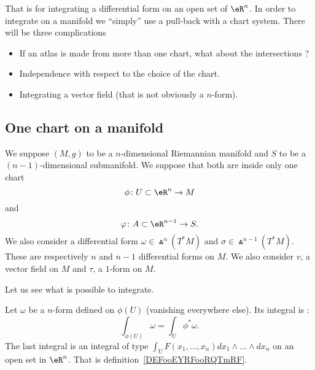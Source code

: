 That is for integrating a differential form on an open set of \( \eR^n\). In order to integrate on a manifold we ``simply'' use a pull-back with a chart system. There will be three complications
\begin{itemize}
	\item If an atlas is made from more than one chart, what about the intersections ?
	\item Independence with respect to the choice of the chart.
	\item Integrating a vector field (that is not obviously a \( n\)-form).
\end{itemize}

\subsection{One chart on a manifold}

We suppose \( (M,g)\) to be a \( n\)-dimensional Riemannian manifold and \( S\) to be a \( (n-1)\)-dimensional submanifold. We suppose that both are inside only one chart
\begin{equation}
	\phi\colon U\subset \eR^n\to M
\end{equation}
and
\begin{equation}
	\varphi\colon A\subset \eR^{n-1}\to S.
\end{equation}
We also consider a differential form \( \omega\in \Wedge^n(T^*M)\) and \( \sigma\in\Wedge^{n-1}(T^*M)\). These are respectively \( n\) and \( n-1\) differential forms on \( M\).  We also consider \( v\), a vector field on \( M\) and \( \tau\), a \( 1\)-form on \(M\).

Let us see what is possible to integrate.

\begin{definition}       \label{DEFooPDRCooPiBklC}
	Let \( \omega\) be a \( n\)-form defined on \( \phi(U)\) (vanishing everywhere else). Its integral is :
	\begin{equation}
		\int_{\phi(U)}\omega=\int_U\phi^*\omega.
	\end{equation}
	The last integral is an integral of type \( \int_{U}F(x_1,\ldots, x_n)dx_1\wedge\ldots \wedge dx_n\) on an open set in \( \eR^n\). That is definition~\ref{DEFooEYRFooRQTmRF}.
\end{definition}

